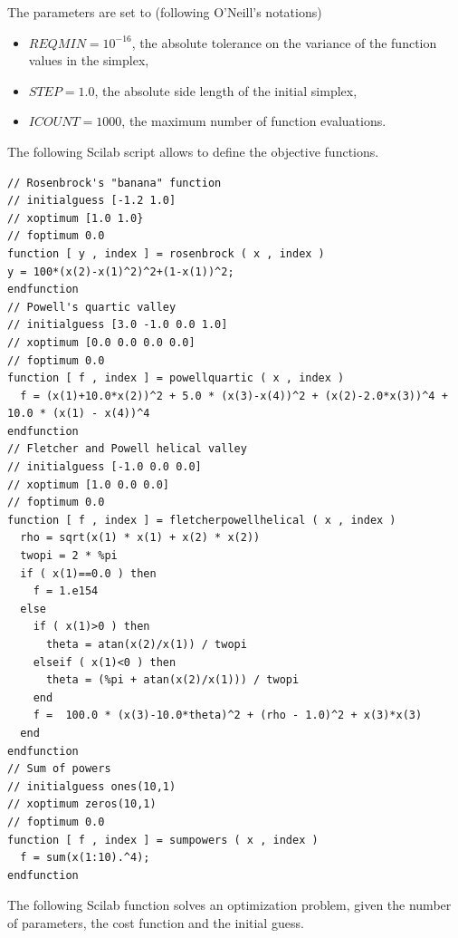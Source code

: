 The parameters are set to (following O'Neill's notations) 
\begin{itemize}
\item $REQMIN=10^{-16}$, the absolute tolerance on the variance of the function 
values in the simplex,
\item $STEP = 1.0$, the absolute side length of the initial simplex,
\item $ICOUNT=1000$, the maximum number of function evaluations.
\end{itemize}

The following Scilab script allows to define the objective functions.

\lstset{language=scilabscript}
\begin{lstlisting}
// Rosenbrock's "banana" function
// initialguess [-1.2 1.0]
// xoptimum [1.0 1.0}
// foptimum 0.0
function [ y , index ] = rosenbrock ( x , index )
y = 100*(x(2)-x(1)^2)^2+(1-x(1))^2;
endfunction
// Powell's quartic valley
// initialguess [3.0 -1.0 0.0 1.0]
// xoptimum [0.0 0.0 0.0 0.0]
// foptimum 0.0
function [ f , index ] = powellquartic ( x , index )
  f = (x(1)+10.0*x(2))^2 + 5.0 * (x(3)-x(4))^2 + (x(2)-2.0*x(3))^4 + 10.0 * (x(1) - x(4))^4
endfunction
// Fletcher and Powell helical valley
// initialguess [-1.0 0.0 0.0]
// xoptimum [1.0 0.0 0.0]
// foptimum 0.0
function [ f , index ] = fletcherpowellhelical ( x , index )
  rho = sqrt(x(1) * x(1) + x(2) * x(2))
  twopi = 2 * %pi
  if ( x(1)==0.0 ) then
    f = 1.e154
  else
    if ( x(1)>0 ) then
      theta = atan(x(2)/x(1)) / twopi
    elseif ( x(1)<0 ) then
      theta = (%pi + atan(x(2)/x(1))) / twopi
    end
    f =  100.0 * (x(3)-10.0*theta)^2 + (rho - 1.0)^2 + x(3)*x(3)
  end
endfunction
// Sum of powers
// initialguess ones(10,1)
// xoptimum zeros(10,1)
// foptimum 0.0
function [ f , index ] = sumpowers ( x , index )
  f = sum(x(1:10).^4);
endfunction
\end{lstlisting}

The following Scilab function solves an optimization problem,
given the number of parameters, the cost function and the 
initial guess.

